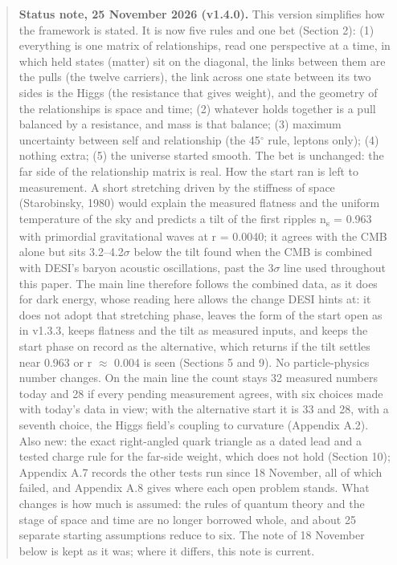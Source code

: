 \documentclass[
  11pt,
]{article}
\begin{document}
\begin{quote}
\textbf{Status note, 25 November 2026 (v1.4.0).} This version simplifies how the framework is stated. It is now five rules and one bet (Section 2): (1) everything is one matrix of relationships, read one perspective at a time, in which held states (matter) sit on the diagonal, the links between them are the pulls (the twelve carriers), the link across one state between its two sides is the Higgs (the resistance that gives weight), and the geometry of the relationships is space and time; (2) whatever holds together is a pull balanced by a resistance, and mass is that balance; (3) maximum uncertainty between self and relationship (the 45\ensuremath{^\circ} rule, leptons only); (4) nothing extra; (5) the universe started smooth. The bet is unchanged: the far side of the relationship matrix is real. How the start ran is left to measurement. A short stretching driven by the stiffness of space (Starobinsky, 1980) would explain the measured flatness and the uniform temperature of the sky and predicts a tilt of the first ripples n\textsubscript{s} = 0.963 with primordial gravitational waves at r = 0.0040; it agrees with the CMB alone but sits 3.2--4.2\ensuremath{\sigma} below the tilt found when the CMB is combined with DESI's baryon acoustic oscillations, past the 3\ensuremath{\sigma} line used throughout this paper. The main line therefore follows the combined data, as it does for dark energy, whose reading here allows the change DESI hints at: it does not adopt that stretching phase, leaves the form of the start open as in v1.3.3, keeps flatness and the tilt as measured inputs, and keeps the start phase on record as the alternative, which returns if the tilt settles near 0.963 or r \ensuremath{\approx} 0.004 is seen (Sections 5 and 9). No particle-physics number changes. On the main line the count stays 32 measured numbers today and 28 if every pending measurement agrees, with six choices made with today's data in view; with the alternative start it is 33 and 28, with a seventh choice, the Higgs field's coupling to curvature (Appendix A.2). Also new: the exact right-angled quark triangle as a dated lead and a tested charge rule for the far-side weight, which does not hold (Section 10); Appendix A.7 records the other tests run since 18 November, all of which failed, and Appendix A.8 gives where each open problem stands. What changes is how much is assumed: the rules of quantum theory and the stage of space and time are no longer borrowed whole, and about 25 separate starting assumptions reduce to six. The note of 18 November below is kept as it was; where it differs, this note is current.
\end{quote}
\end{document}
